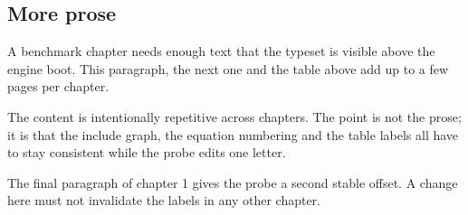 \subsection{More prose}
A benchmark chapter needs enough text that the type\-set is visible above the
engine boot. This paragraph, the next one and the table above add up to a few
pages per chapter.

The content is intentionally repetitive across chapters. The point is not the
prose; it is that the include graph, the equation numbering and the table
labels all have to stay consistent while the probe edits one letter.

The final paragraph of chapter 1 gives the probe a second stable offset. A
change here must not invalidate the labels in any other chapter.
